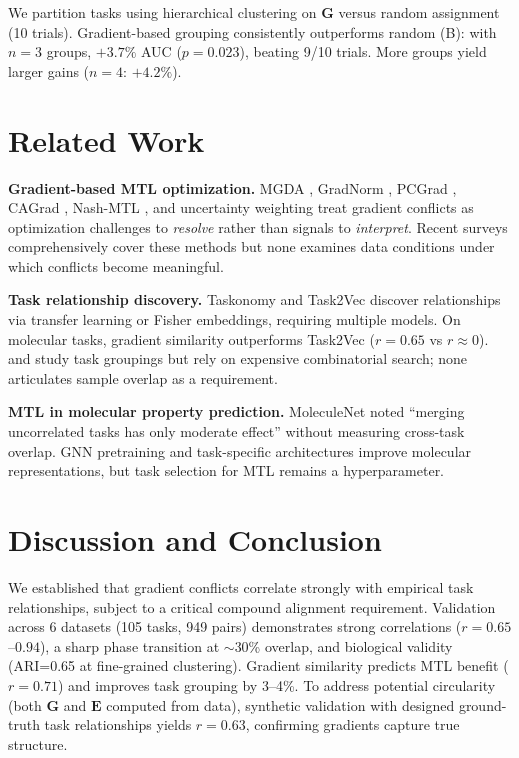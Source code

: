 \documentclass[sigconf,nonacm]{acmart}
\newcommand{\G}{\mathbf{G}}
\newcommand{\E}{\mathbf{E}}
\begin{document}
We partition tasks using hierarchical clustering on $\G$ versus random assignment (10 trials). Gradient-based grouping consistently outperforms random (B): with $n=3$ groups, $+3.7\%$ AUC ($p = 0.023$), beating 9/10 trials. More groups yield larger gains ($n=4$: $+4.2\%$).

\section{Related Work}

\textbf{Gradient-based MTL optimization.} MGDA \cite{sener2018multi}, GradNorm \cite{chen2018gradnorm}, PCGrad \cite{yu2020gradient}, CAGrad \cite{liu2021conflict}, Nash-MTL \cite{navon2022multi}, and uncertainty weighting \cite{kendall2018multi} treat gradient conflicts as optimization challenges to \textit{resolve} rather than signals to \textit{interpret}. Recent surveys \cite{zhang2021survey} comprehensively cover these methods but none examines data conditions under which conflicts become meaningful.

\textbf{Task relationship discovery.} Taskonomy \cite{zamir2018taskonomy} and Task2Vec \cite{achille2019task2vec} discover relationships via transfer learning or Fisher embeddings, requiring multiple models. On molecular tasks, gradient similarity outperforms Task2Vec ($r = 0.65$ vs $r \approx 0$). \citet{fifty2021efficiently} and \citet{standley2020tasks} study task groupings but rely on expensive combinatorial search; none articulates sample overlap as a requirement.

\textbf{MTL in molecular property prediction.} MoleculeNet \cite{wu2018moleculenet} noted ``merging uncorrelated tasks has only moderate effect'' without measuring cross-task overlap. GNN pretraining \cite{hu2020pretraining} and task-specific architectures \cite{gilmer2017neural, yang2019analyzing} improve molecular representations, but task selection for MTL remains a hyperparameter.

\section{Discussion and Conclusion}

We established that gradient conflicts correlate strongly with empirical task relationships, subject to a critical compound alignment requirement. Validation across 6 datasets (105 tasks, 949 pairs) demonstrates strong correlations ($r = 0.65$--$0.94$), a sharp phase transition at $\sim$30\% overlap, and biological validity (ARI=0.65 at fine-grained clustering). Gradient similarity predicts MTL benefit ($r = 0.71$) and improves task grouping by 3--4\%. To address potential circularity (both $\G$ and $\E$ computed from data), synthetic validation with designed ground-truth task relationships yields $r = 0.63$, confirming gradients capture true structure.
\end{document}
